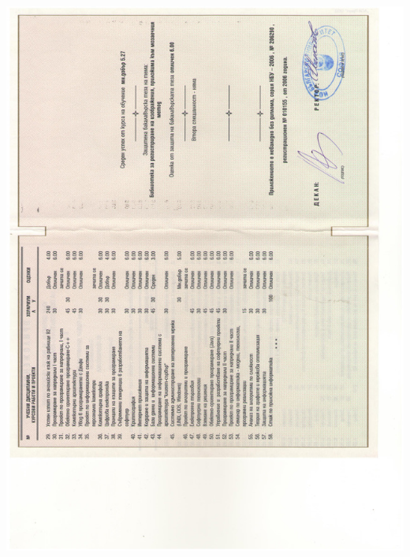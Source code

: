 \documentclass[bulgarian,a4paper]{europasscv}
\begin{document}
\includegraphics[width=\textwidth,height=\textheight,keepaspectratio]{DiplomaNBU2006_4}
\end{document}
